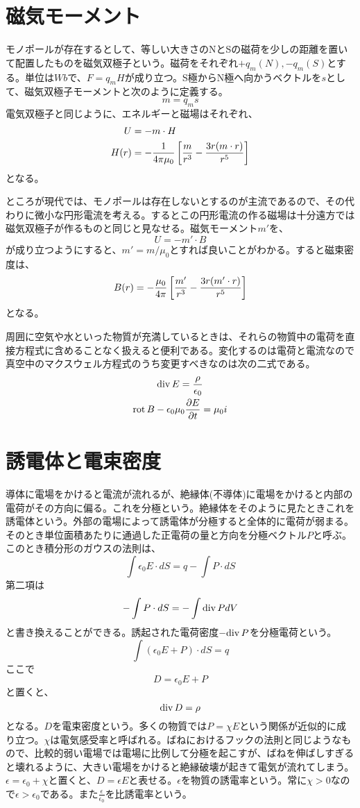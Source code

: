     \section{磁気モーメント}
        モノポールが存在するとして、等しい大きさのNとSの磁荷を少しの距離を置いて配置したものを磁気双極子という。磁荷をそれぞれ$+q_m(N),-q_m(S)$とする。単位は$Wb$で、$F = q_m H$が成り立つ。S極からN極へ向かうベクトルを$s$として、磁気双極子モーメントと次のように定義する。
            \[m = q_m s\]
        電気双極子と同じように、エネルギーと磁場はそれぞれ、
        \begin{align*}
            U &= -m\cdot H\\
            H(r) &= -\rec{4\pi\mu_0}\llr{\frac{m}{r^3} - \frac{3r(m\cdot r)}{r^5}}
        \end{align*}
        となる。

        ところが現代では、モノポールは存在しないとするのが主流であるので、その代わりに微小な円形電流を考える。するとこの円形電流の作る磁場は十分遠方では磁気双極子が作るものと同じと見なせる。磁気モーメント$m'$を、
            \[U = -m'\cdot B\]
        が成り立つようにすると、$m'=m/\mu_0$とすれば良いことがわかる。すると磁束密度は、
            \[B(r) = -\frac{\mu_0}{4\pi}\llr{\frac{m'}{r^3}
            -\frac{3r(m'\cdot r)}{r^5}}\]
        となる。

    周囲に空気や水といった物質が充満しているときは、それらの物質中の電荷を直接方程式に含めることなく扱えると便利である。変化するのは電荷と電流なので真空中のマクスウェル方程式のうち変更すべきなのは次の二式である。
    \begin{gather*}
        \dive E = \frac{\rho}{\epsilon_0}\\
        \rot B - \epsilon_0\mu_0\pd[E]{t} = \mu_0 i
    \end{gather*}

    \section{誘電体と電束密度}
        導体に電場をかけると電流が流れるが、絶縁体(不導体)に電場をかけると内部の電荷がその方向に偏る。これを分極という。絶縁体をそのように見たときこれを誘電体という。外部の電場によって誘電体が分極すると全体的に電荷が弱まる。そのとき単位面積あたりに通過した正電荷の量と方向を分極ベクトル$P$と呼ぶ。このとき積分形のガウスの法則は、
            \[\int \epsilon_0 E\cdot dS = q - \int P\cdot dS\]
        第二項は
            \[- \int P\cdot dS = - \int \dive P dV\]
        と書き換えることができる。誘起された電荷密度$-\dive P$を分極電荷という。
            \[\int (\epsilon_0 E + P)\cdot dS = q\]
        ここで
            \[D = \epsilon_0 E + P\]
        と置くと、
            \[\dive D = \rho\]
        となる。$D$を電束密度という。多くの物質では$P = \chi E$という関係が近似的に成り立つ。$\chi$は電気感受率と呼ばれる。ばねにおけるフックの法則と同じようなもので、比較的弱い電場では電場に比例して分極を起こすが、ばねを伸ばしすぎると壊れるように、大きい電場をかけると絶縁破壊が起きて電気が流れてしまう。$\epsilon = \epsilon_0 + \chi$と置くと、$D = \epsilon E$と表せる。$\epsilon$を物質の誘電率という。常に$\chi > 0$なので$\epsilon > \epsilon_0$である。また$\frac{\epsilon}{\epsilon_0}$を比誘電率という。
